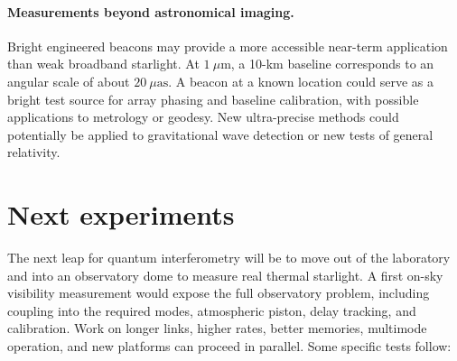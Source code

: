 \documentclass[]{spie}
\begin{document}
\paragraph{Measurements beyond astronomical imaging.}
Bright engineered beacons may provide a more accessible near-term application than weak broadband starlight. At $1~\mu$m, a 10-km baseline corresponds to an angular scale of about $20~\mu\mathrm{as}$. A beacon at a known location could serve as a bright test source for array phasing and baseline calibration, with possible applications to metrology or geodesy.
New ultra-precise methods could potentially be applied to gravitational wave detection or new tests of general relativity.



\section{Next experiments}
\label{sec:roadmap}

The next leap for quantum interferometry will be to move out of the laboratory and into an observatory dome to measure real thermal starlight. A first on-sky visibility measurement would expose the full observatory problem, including coupling into the required modes, atmospheric piston, delay tracking, and calibration. Work on longer links, higher rates, better memories, multimode operation, and new platforms can proceed in parallel. Some specific tests follow:
\end{document}
